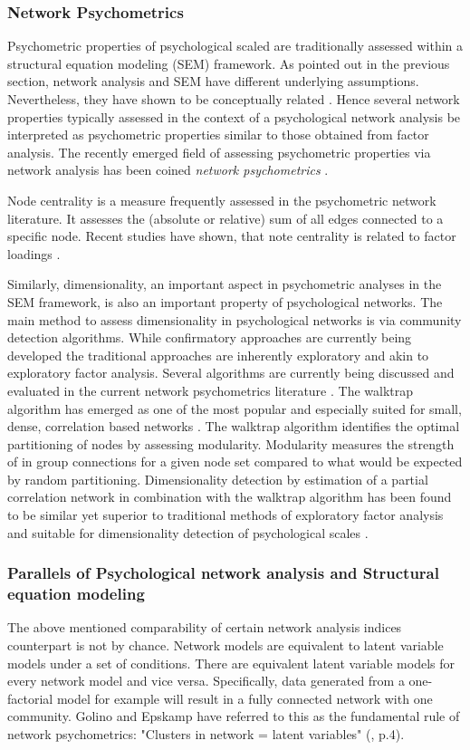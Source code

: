 \subsubsection{Network Psychometrics}
Psychometric properties of psychological scaled are traditionally assessed within a structural equation modeling (SEM) framework.
As pointed out in the previous section, network analysis and SEM have different underlying assumptions. 
Nevertheless, they have shown to be conceptually related \parencite{epskamp_network_2018}.
Hence several network properties typically assessed in the context of a psychological network analysis
be interpreted as psychometric properties similar to those obtained from factor analysis. 
The recently emerged field of assessing psychometric properties via network analysis has been coined \textit{network psychometrics} \parencite{epskamp_network_2018}.

Node centrality is a measure frequently assessed in the psychometric network literature. 
It assesses the (absolute or relative) sum of all edges connected to a specific node.
Recent studies have shown, that note centrality is related to factor loadings \parencite{mottus_why_2018}.

Similarly, dimensionality, an important aspect in psychometric analyses in the SEM framework, is also an important property of psychological networks.
The main method to assess dimensionality in psychological networks is via community detection algorithms.
While confirmatory approaches are currently being developed the traditional approaches are inherently exploratory and akin to exploratory factor analysis.
Several algorithms are currently being discussed and evaluated in the current network psychometrics literature \parencite{christensen_towards_2020}.
The walktrap algorithm has emerged as one of the most popular and especially suited for small, dense, correlation based networks \parencite{gates_monte_2016}. 
The walktrap algorithm identifies the optimal partitioning of nodes by assessing modularity. 
Modularity measures the strength of in group connections for a given node set compared to what would be expected by random partitioning.
Dimensionality detection by estimation of a partial correlation network in combination with the walktrap algorithm has been found to be 
similar yet superior to traditional methods of exploratory factor analysis and suitable for dimensionality detection of psychological scales \parencite{golino_exploratory_2017}.

\subsubsection{Parallels of Psychological network analysis and Structural equation modeling}
The above mentioned comparability of certain network analysis indices counterpart is not by chance.
Network models are equivalent to latent variable models under a set of conditions.
There are equivalent latent variable models for every network model and vice versa.
Specifically, data generated from a one-factorial model for example will result in a fully connected network with one community. 
Golino and Epskamp have referred to this as the fundamental rule of network psychometrics: "Clusters in network = latent variables" (\nptextcite, p.4).

